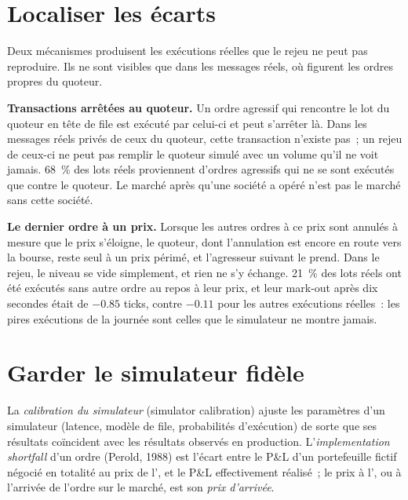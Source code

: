 \section{Localiser les écarts}

Deux mécanismes produisent les exécutions réelles que le rejeu ne peut pas reproduire. Ils ne sont visibles que dans les messages réels, où figurent les ordres propres du quoteur.

\textbf{Transactions arrêtées au quoteur.} Un ordre agressif qui rencontre le lot du quoteur en tête de file est exécuté par celui-ci et peut s'arrêter là. Dans les
messages réels privés de ceux du quoteur, cette transaction n'existe pas~; un rejeu de ceux-ci ne peut pas remplir le quoteur simulé avec un volume qu'il ne voit jamais. 68~\% des lots réels proviennent d'ordres agressifs
qui ne se sont exécutés que contre le quoteur. Le marché après qu'une société a opéré n'est pas le marché sans cette société.

\textbf{Le dernier ordre à un prix.} Lorsque les autres ordres à ce prix sont annulés à mesure que le prix s'éloigne, le quoteur, dont l'annulation est encore en route vers la
bourse, reste seul à un prix périmé, et l'agresseur suivant le prend. Dans le rejeu, le niveau se vide simplement, et rien ne s'y échange. 21~\% des lots réels ont été
exécutés sans autre ordre au repos à leur prix, et leur mark-out après dix secondes était de $-0.85$ ticks, contre $-0.11$ pour les autres exécutions réelles~: les pires exécutions
de la journée sont celles que le simulateur ne montre jamais.

\section{Garder le simulateur fidèle}

\begin{definition}\label{def:rs:simulation-versus-live:calibration}
La \emph{calibration du simulateur} (simulator calibration) ajuste les paramètres d'un simulateur (latence, modèle de file, probabilités d'exécution) de sorte que ses résultats coïncident avec les
résultats observés en production. L'\emph{implementation shortfall} d'un ordre (Perold, 1988) est l'écart entre le P\&L d'un portefeuille fictif négocié
en totalité au prix de l', et le P\&L effectivement réalisé~; le prix à l', ou à l'arrivée de l'ordre sur le marché, est son \emph{prix
d'arrivée}.
\end{definition}

